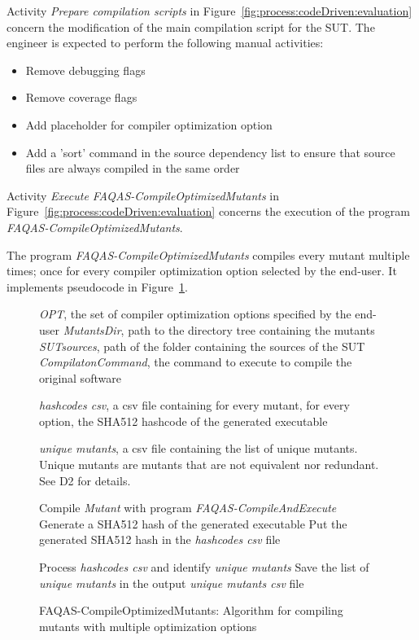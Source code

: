\RQ{} Activity \emph{Prepare compilation scripts} in Figure~\ref{fig:process:codeDriven:evaluation} concern the modification of the main compilation script for the SUT. The engineer is expected to perform the following manual activities:
\begin{itemize}
\item Remove debugging flags
\item Remove coverage flags
\item Add placeholder for compiler optimization option
\item Add a 'sort' command in the source dependency list to ensure that source files are always compiled in the same order
\end{itemize}



\RQ{} Activity \emph{Execute FAQAS-CompileOptimizedMutants} in Figure~\ref{fig:process:codeDriven:evaluation} concerns the execution of the program \emph{FAQAS-CompileOptimizedMutants}.

\RQ{} The program \emph{FAQAS-CompileOptimizedMutants} compiles every mutant multiple times; once for every compiler optimization option selected by the end-user. It implements pseudocode in Figure~\ref{alg:CompileOptimizedMutants}.

\begin{figure}[h]
\begin{algorithmic}[1]

\scriptsize


\Require \emph{OPT}, the set of compiler optimization options specified by the end-user
\Require \emph{MutantsDir}, path to the directory tree containing the mutants
\Require \emph{SUTsources}, path of the folder containing the sources of the SUT
\Require \emph{CompilatonCommand}, the command to execute to compile the original software

\Ensure \emph{hashcodes csv}, a csv file containing for every mutant, for every option, the SHA512 hashcode of the generated executable

\Ensure \emph{unique mutants}, a csv file containing the list of unique mutants. Unique mutants are mutants that are not equivalent nor redundant. See D2 for details.

\State Compile \emph{Mutant} with program \emph{FAQAS-CompileAndExecute}
\State Generate a SHA512 hash of the generated executable
\State Put the generated SHA512 hash in the \emph{hashcodes csv} file
\EndFor
\EndFor

\State Process \emph{hashcodes csv} and identify \emph{unique mutants}
\State Save the list of \emph{unique mutants} in the output \emph{unique mutants csv} file

\end{algorithmic}
\vspace{-3mm}
\caption{FAQAS-CompileOptimizedMutants: Algorithm for compiling mutants with multiple optimization options}
\label{alg:CompileOptimizedMutants}
\end{figure}





